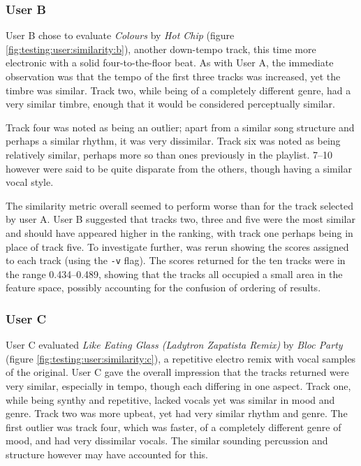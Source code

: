 \subsubsection{User B}
User B chose to evaluate \emph{Colours} by \emph{Hot Chip} (figure \ref{fig:testing:user:similarity:b}), another down-tempo track, this time more electronic with a solid four-to-the-floor beat. As with User A, the immediate observation was that the tempo of the first three tracks was increased, yet the timbre was similar. Track two, while being of a completely different genre, had a very similar timbre, enough that it would be considered perceptually similar.


Track four was noted as being an outlier; apart from a similar song structure and perhaps a similar rhythm, it was very dissimilar. Track six was noted as being relatively similar, perhaps more so than ones previously in the playlist. 7--10 however were said to be quite disparate from the others, though having a similar vocal style.

The similarity metric overall seemed to perform worse than for the track selected by user A. User B suggested that tracks two, three and five were the most similar and should have appeared higher in the ranking, with track one perhaps being in place of track five. To investigate further,  was rerun showing the scores assigned to each track (using the \texttt{-v} flag). The scores returned for the ten tracks were in the range 0.434--0.489, showing that the tracks all occupied a small area in the feature space, possibly accounting for the confusion of ordering of results.
\subsubsection{User C}
User C evaluated \emph{Like Eating Glass (Ladytron Zapatista Remix)} by \emph{Bloc Party} (figure \ref{fig:testing:user:similarity:c}), a repetitive electro remix with vocal samples of the original. User C gave the overall impression that the tracks returned were very similar, especially in tempo, though each differing in one aspect. Track one, while being synthy and repetitive, lacked vocals yet was similar in mood and genre. Track two was more upbeat, yet had very similar rhythm and genre. The first outlier was track four, which was faster, of a completely different genre of mood, and had very dissimilar vocals. The similar sounding percussion and structure however may have accounted for this.

